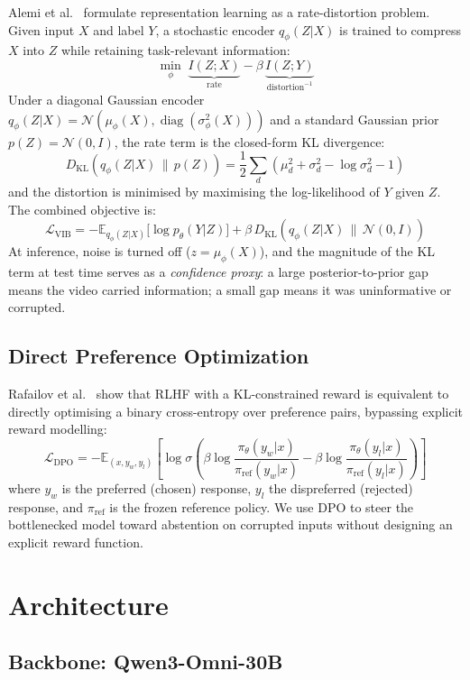\documentclass[11pt,a4paper]{article}
\begin{document}
Alemi et al.~\cite{alemi2017vib} formulate representation learning as a
rate-distortion problem.  Given input $X$ and label $Y$, a stochastic encoder
$q_\phi(Z|X)$ is trained to compress $X$ into $Z$ while retaining task-relevant
information:
\[
  \min_\phi \;\underbrace{I(Z;X)}_{\text{rate}} - \beta\,\underbrace{I(Z;Y)}_{\text{distortion}^{-1}}
\]
Under a diagonal Gaussian encoder $q_\phi(Z|X) = \mathcal{N}(\mu_\phi(X),
\operatorname{diag}(\sigma^2_\phi(X)))$ and a standard Gaussian prior $p(Z)
= \mathcal{N}(0,I)$, the rate term is the closed-form KL divergence:
\[
  D_{\mathrm{KL}}(q_\phi(Z|X)\,\|\,p(Z))
  = \frac{1}{2}\sum_d \left(\mu_d^2 + \sigma_d^2 - \log\sigma_d^2 - 1\right)
\]
and the distortion is minimised by maximising the log-likelihood of $Y$ given
$Z$.  The combined objective is:
\[
  \mathcal{L}_{\mathrm{VIB}} = -\mathbb{E}_{q_\phi(Z|X)}\bigl[\log p_\theta(Y|Z)\bigr]
    + \beta\,D_{\mathrm{KL}}\!\left(q_\phi(Z|X)\,\|\,\mathcal{N}(0,I)\right)
\]
At inference, noise is turned off ($z = \mu_\phi(X)$), and the magnitude of
the KL term at test time serves as a \emph{confidence proxy}: a large
posterior-to-prior gap means the video carried information; a small gap means
it was uninformative or corrupted.

\subsection{Direct Preference Optimization}

Rafailov et al.~\cite{rafailov2023dpo} show that RLHF with a KL-constrained
reward is equivalent to directly optimising a binary cross-entropy over
preference pairs, bypassing explicit reward modelling:
\[
  \mathcal{L}_{\mathrm{DPO}} = -\mathbb{E}_{(x,y_w,y_l)}\!\left[
    \log\sigma\!\left(
      \beta\log\frac{\pi_\theta(y_w|x)}{\pi_{\mathrm{ref}}(y_w|x)}
    - \beta\log\frac{\pi_\theta(y_l|x)}{\pi_{\mathrm{ref}}(y_l|x)}
    \right)\right]
\]
where $y_w$ is the preferred (chosen) response, $y_l$ the dispreferred
(rejected) response, and $\pi_{\mathrm{ref}}$ is the frozen reference policy.
We use DPO to steer the bottlenecked model toward abstention on corrupted
inputs without designing an explicit reward function.

\section{Architecture}

\subsection{Backbone: Qwen3-Omni-30B}
\end{document}
